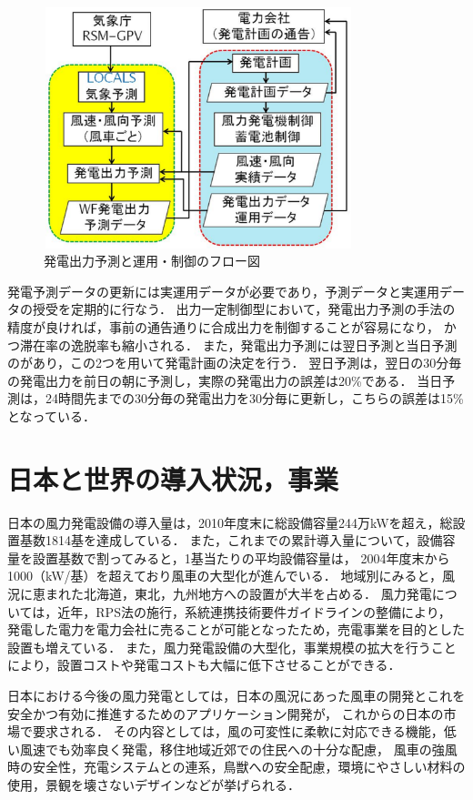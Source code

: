 \documentclass[a4paper,12pt,showkeys]{jreport}
\begin{document}
\begin{figure}[h]
\centering
\includegraphics[width=9cm,height=7cm, clip]{yosoku.eps}
\caption{発電出力予測と運用・制御のフロー図\cite{電力}}
\label{fig:yosoku}
\end{figure}

発電予測データの更新には実運用データが必要であり，予測データと実運用データの授受を定期的に行なう．
出力一定制御型において，発電出力予測の手法の精度が良ければ，事前の通告通りに合成出力を制御することが容易になり，
かつ滞在率の逸脱率も縮小される．
また，発電出力予測には翌日予測と当日予測のがあり，この2つを用いて発電計画の決定を行う．
翌日予測は，翌日の30分毎の発電出力を前日の朝に予測し，実際の発電出力の誤差は20\%である．
当日予測は，24時間先までの30分毎の発電出力を30分毎に更新し，こちらの誤差は15\%となっている\cite{予測}．


\section{日本と世界の導入状況，事業}

日本の風力発電設備の導入量は，2010年度末に総設備容量244万kWを超え，総設置基数1814基を達成している．
また，これまでの累計導入量について，設備容量を設置基数で割ってみると，1基当たりの平均設備容量は，
2004年度末から1000（kW/基）を超えており風車の大型化が進んでいる．
地域別にみると，風況に恵まれた北海道，東北，九州地方への設置が大半を占める．
風力発電については，近年，RPS法の施行，系統連携技術要件ガイドラインの整備により，
発電した電力を電力会社に売ることが可能となったため，売電事業を目的とした設置も増えている．
また，風力発電設備の大型化，事業規模の拡大を行うことにより，設置コストや発電コストも大幅に低下させることができる\cite{NEDO}．

日本における今後の風力発電としては，日本の風況にあった風車の開発とこれを安全かつ有効に推進するためのアプリケーション開発が，
これからの日本の市場で要求される．
その内容としては，風の可変性に柔軟に対応できる機能，低い風速でも効率良く発電，移住地域近郊での住民への十分な配慮，
風車の強風時の安全性，充電システムとの連系，鳥獣への安全配慮，環境にやさしい材料の使用，景観を壊さないデザインなどが挙げられる\cite{吉田}．
\end{document}
